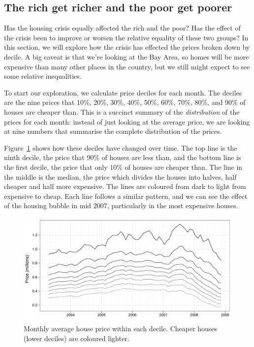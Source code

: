 \documentclass[oneside]{article}
\begin{document}
\subsection{The rich get richer and the poor get poorer}

Has the housing crisis equally affected the rich and the poor?  Has the effect of the crisis been to improve or worsen the relative equality of these two groups?  In this section, we will explore how the crisis has effected the prices broken down by decile.  A big caveat is that we're looking at the Bay Area, so homes will be more expensive than many other places in the country, but we still might expect to see some relative inequalities.

To start our exploration, we calculate price deciles for each month.  The deciles are the nine prices that 10\%, 20\%, 30\%, 40\%, 50\%, 60\%, 70\%, 80\%, and 90\% of houses are cheaper than.  This is a succinct summary of the {\it distribution} of the prices for each month: instead of just looking at the average price, we are looking at nine numbers that summarise the complete distribution of the prices. 

Figure~\ref{fig:decile-raw} shows how these deciles have changed over time.  The top line is the ninth decile, the price that 90\% of houses are less than, and the bottom line is the first decile, the price that only 10\% of houses are cheaper than.  The line in the middle is the median, the price which divides the houses into halves, half cheaper and half more expensive.  The lines are coloured from dark to light from expensive to cheap.  Each line follows a similar pattern, and we can see the effect of the housing bubble in mid 2007, particularly in the most expensive houses.  

\begin{figure}[htbp]
  \centering
  \includegraphics[width=0.75\linewidth]{decile-raw}
  \caption{Monthly average house price within each decile.  Cheaper houses (lower deciles) are coloured lighter.} 
  \label{fig:decile-raw}
\end{figure}
\end{document}
